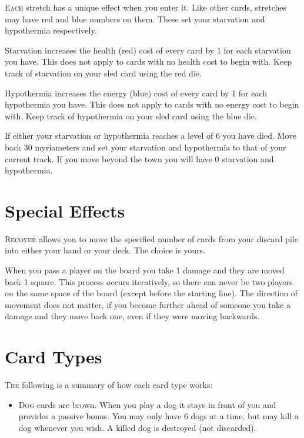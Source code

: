 \documentclass{article}
\begin{document}
\begin{multicols}{3}
    \textsc{Each} stretch has a unique effect when you enter it. Like other cards,
    stretches may have red and blue numbers on them. These set your starvation
    and hypothermia respectively.

    Starvation increases the health (red) cost of every card by 1 for each
    starvation you have. This does not apply to cards with no health cost to
    begin with. Keep track of starvation on your sled card using the red die.

    Hypothermia increases the energy (blue) cost of every card by 1 for each
    hypothermia you have. This does not apply to cards with no energy cost to
    begin with. Keep track of hypothermia on your sled card using the blue die.

    If either your starvation or hypothermia reaches a level of 6 you have died.
    Move back 30 myriameters and set your starvation and hypothermia to that of
    your current track. If you move beyond the town you will have 0 starvation
    and hypothermia.

\section{Special Effects}

    \textsc{Recover} allows you to move the specified number of cards from your discard
    pile into either your hand or your deck. The choice is yours.

    When you pass a player on the board you take 1 damage and they are moved
    back 1 square. This process occurs iteratively, so there can never be two
    players on the same space of the board (except before the starting line).
    The direction of movement does not matter, if you become further ahead of
    someone you take a damage and they move back one, even if they were moving
    backwards.

\section{Card Types}

    \textsc{The} following is a summary of how each card type works:

    \begin{itemize}
        \setlength\itemsep{-0.8ex}
        \item \textsc{Dog} cards are brown. When you play a dog it stays in front of you
            and provides a passive bonus. You may only have 6 dogs at a time,
            but may kill a dog whenever you wish. A killed dog is destroyed (not
            discarded).


\end{itemize}
\end{multicols}
\end{document}
